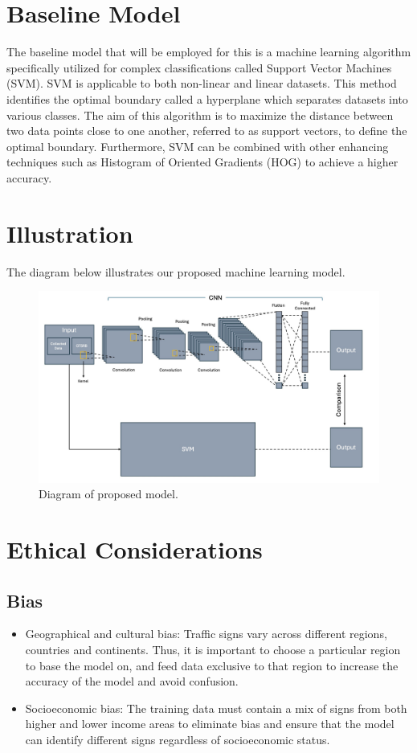 \documentclass{article} %
\begin{document}
\section{Baseline Model}
The baseline model that will be employed for this is a machine learning algorithm specifically utilized for complex classifications called Support Vector Machines (SVM). SVM is applicable to both non-linear and linear datasets. This method identifies the optimal boundary called a hyperplane which separates datasets into various classes. The aim of this algorithm is to maximize the distance between two data points close to one another, referred to as support vectors, to define the optimal boundary. Furthermore, SVM can be combined with other enhancing techniques such as Histogram of Oriented Gradients (HOG) to achieve a higher accuracy. 
\newpage

\section{Illustration}
The diagram below illustrates our proposed machine learning model.
\label{gen_inst}
\begin{figure}[h]
\begin{center}
\includegraphics[width=\textwidth]{Figs/aps350_proposal_figure.jpg}
\end{center}
\caption{Diagram of proposed model.}
\end{figure}




\section{Ethical Considerations}
\subsection*{Bias}
\begin{itemize}
    \item Geographical and cultural bias: Traffic signs vary across different regions, countries and continents. Thus, it is important to choose a particular region to base the model on, and feed data exclusive to that region to increase the accuracy of the model and avoid confusion.
    \item Socioeconomic bias: The training data must contain a mix of signs from both higher and lower income areas to eliminate bias and ensure that the model can identify different signs regardless of socioeconomic status.
\end{itemize}
\end{document}
